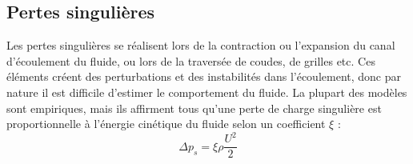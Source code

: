 \subsection{Pertes singulières}
Les pertes singulières se réalisent lors de la contraction ou l’expansion du canal d’écoulement du fluide, ou lors de la traversée de coudes, de grilles etc. Ces éléments créent des perturbations et des instabilités dans l'écoulement, donc par nature il est difficile d'estimer le comportement du fluide. La plupart des modèles sont empiriques, mais ils affirment tous qu’une perte de charge singulière est proportionnelle à l’énergie cinétique du fluide selon un coefficient $\xi$ :
%
\begin{equation}
    \Delta p_s = \xi \rho \frac{U^2}{2}
\end{equation}

